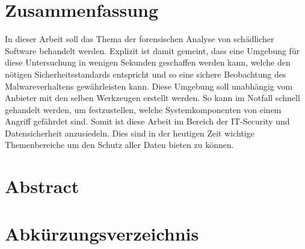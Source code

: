 \documentclass[12pt,oneside]{article}
\begin{document}
\lhead{}
    \setcounter{page}{1}

\tableofcontents
\clearpage

\section*{Zusammenfassung}

In dieser Arbeit soll das Thema der forensischen Analyse von schädlicher Software behandelt werden. Explizit ist damit gemeint, dass eine Umgebung für diese Untersuchung in wenigen Sekunden geschaffen werden kann, welche den nötigen Sicherheitsstandards entspricht und so eine sichere Beobachtung des Malwareverhaltens gewährleisten kann. Diese Umgebung soll unabhängig vom Anbieter mit den selben Werkzeugen erstellt werden. So kann im Notfall schnell gehandelt werden, um festzustellen, welche Systemkomponenten von einem Angriff gefährdet sind.
\newline Somit ist diese Arbeit im Bereich der IT-Security und Datensicherheit anzusiedeln. Dies sind in der heutigen Zeit wichtige Themenbereiche um den Schutz aller Daten bieten zu können.

\newpage
{}
\section*{Abstract}



\newpage
{} 
\listoffigures

\newpage
{}
\listoftables
\newpage

\setlength{\parskip}{0.5em} 


\section*{Abkürzungsverzeichnis} 

\begin{acronym}
\end{acronym}
\newpage
\end{document}
